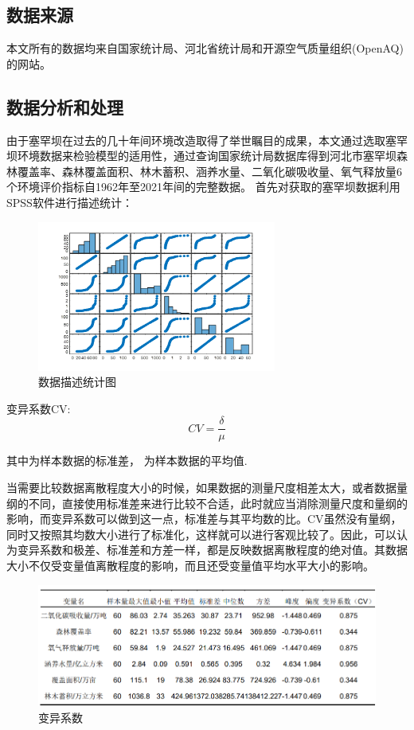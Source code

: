 \documentclass[UTF8]{ctexart}
\begin{document}
\subsection{数据来源}
本文所有的数据均来自国家统计局、河北省统计局和开源空气质量组织(OpenAQ)的网站。

\subsection{数据分析和处理}
由于塞罕坝在过去的几十年间环境改造取得了举世瞩目的成果，本文通过选取塞罕坝环境数据来检验模型的适用性，通过查询国家统计局数据库得到河北市塞罕坝森林覆盖率、森林覆盖面积、林木蓄积、涵养水量、二氧化碳吸收量、氧气释放量6个环境评价指标自1962年至2021年间的完整数据。
首先对获取的塞罕坝数据利用SPSS软件进行描述统计：

\begin{figure}[H] %
    \centering %
    \includegraphics[width=0.7\textwidth]{./picture/datascrip.png} %
    \caption{数据描述统计图} 
\end{figure}


变异系数CV:
\begin{equation}
    CV=\frac{\delta}{\mu}
\end{equation}

其中为样本数据的标准差， 为样本数据的平均值.

当需要比较数据离散程度大小的时候，如果数据的测量尺度相差太大，或者数据量纲的不同，直接使用标准差来进行比较不合适，此时就应当消除测量尺度和量纲的影响，而变异系数可以做到这一点，标准差与其平均数的比。CV虽然没有量纲，同时又按照其均数大小进行了标准化，这样就可以进行客观比较了。因此，可以认为变异系数和极差、标准差和方差一样，都是反映数据离散程度的绝对值。其数据大小不仅受变量值离散程度的影响，而且还受变量值平均水平大小的影响。
\begin{figure}[H] %
    \centering %
    \includegraphics[width=1\textwidth]{./picture/biaoge1.png} %
    \caption{变异系数} 
\end{figure}
\end{document}
